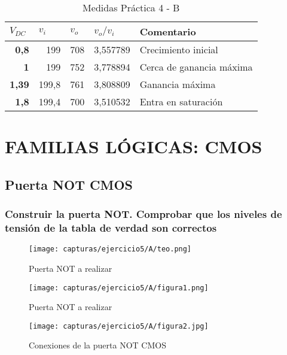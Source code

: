 \begin{table}[H]
	\centering
	\begin{tabular}{rrrrl}
		\multicolumn{1}{l}{\textbf{$ V_{DC} $}} & \multicolumn{1}{l}{\textbf{$ v_{i} $}} & \multicolumn{1}{l}{\textbf{$ v_{o} $}} & \multicolumn{1}{l}{\textbf{$ v_{o}/v_{i} $}} & \textbf{Comentario} \\
		\midrule
		\textbf{0,8}   & 199   & 708   & 3,557789 & Crecimiento inicial \\
		\textbf{1}     & 199   & 752   & 3,778894 & Cerca de ganancia máxima \\
		\textbf{1,39}  & 199,8 & 761   & 3,808809 & Ganancia máxima \\
		\textbf{1,8}   & 199,4 & 700   & 3,510532 & Entra en saturación \\
	\end{tabular}%
	\caption{Medidas Práctica 4 - B}
	\label{tab:p4b}%
\end{table}%

\section{FAMILIAS LÓGICAS: CMOS}

\subsection{Puerta NOT CMOS}

\subsubsection{Construir la puerta NOT. Comprobar que los niveles de tensión de la tabla de verdad son correctos}

\begin{figure}[H] %
	\centering
	\texttt{[image: capturas/ejercicio5/A/teo.png]} 
	\caption{Puerta NOT a realizar}
	\label{fig:practica5-a-1}
\end{figure}
\vspace{-15pt}
\begin{figure}[H] %
	\centering
	\texttt{[image: capturas/ejercicio5/A/figura1.png]} 
	\caption{Puerta NOT a realizar}
	\label{fig:practica5-a-2}
\end{figure}

\begin{figure}[H] %
	\centering
	\texttt{[image: capturas/ejercicio5/A/figura2.jpg]} 
	\caption{Conexiones de la puerta NOT CMOS}
	\label{fig:practica5-a-3}
\end{figure}

